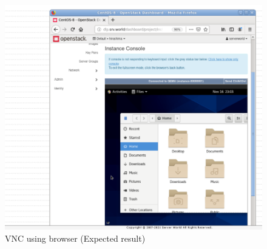 \begin{spacing}{1.2}
\begin{figure}[!htb] 
\begin{center} 
\includegraphics[width=1\linewidth]{Cloud/Configure Horizon/C_11_expected result, since our instance is always at the building state we can't establish the ssh connection.png} 
\end{center} 
\caption{  VNC using browser (Expected result)} 
\end{figure} 
\FloatBarrier
\\
\end{spacing}